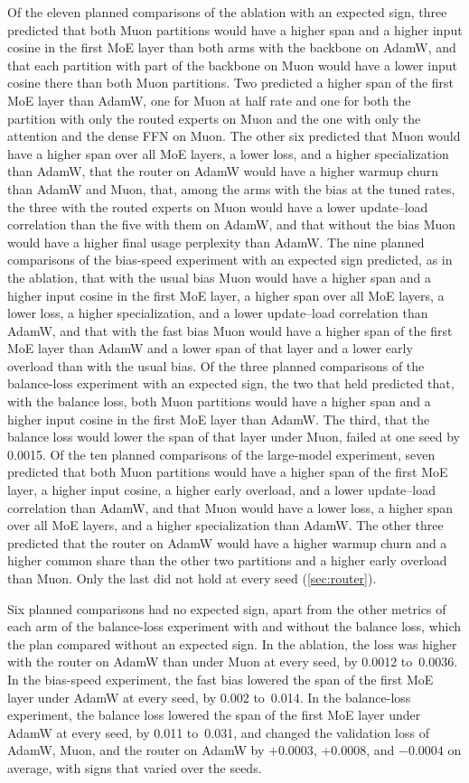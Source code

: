 \documentclass[11pt, a4paper]{article}
\begin{document}
Of the eleven planned comparisons of the ablation with an expected sign, three predicted that both Muon partitions would have a higher span and a higher input cosine in the first MoE layer than both arms with the backbone on AdamW, and that each partition with part of the backbone on Muon would have a lower input cosine there than both Muon partitions. Two predicted a higher span of the first MoE layer than AdamW, one for Muon at half rate and one for both the partition with only the routed experts on Muon and the one with only the attention and the dense FFN on Muon. The other six predicted that Muon would have a higher span over all MoE layers, a lower loss, and a higher specialization than AdamW, that the router on AdamW would have a higher warmup churn than AdamW and Muon, that, among the arms with the bias at the tuned rates, the three with the routed experts on Muon would have a lower update--load correlation than the five with them on AdamW, and that without the bias Muon would have a higher final usage perplexity than AdamW\@. The nine planned comparisons of the bias-speed experiment with an expected sign predicted, as in the ablation, that with the usual bias Muon would have a higher span and a higher input cosine in the first MoE layer, a higher span over all MoE layers, a lower loss, a higher specialization, and a lower update--load correlation than AdamW, and that with the fast bias Muon would have a higher span of the first MoE layer than AdamW and a lower span of that layer and a lower early overload than with the usual bias. Of the three planned comparisons of the balance-loss experiment with an expected sign, the two that held predicted that, with the balance loss, both Muon partitions would have a higher span and a higher input cosine in the first MoE layer than AdamW\@. The third, that the balance loss would lower the span of that layer under Muon, failed at one seed by 0.0015. Of the ten planned comparisons of the large-model experiment, seven predicted that both Muon partitions would have a higher span of the first MoE layer, a higher input cosine, a higher early overload, and a lower update--load correlation than AdamW, and that Muon would have a lower loss, a higher span over all MoE layers, and a higher specialization than AdamW\@. The other three predicted that the router on AdamW would have a higher warmup churn and a higher common share than the other two partitions and a higher early overload than Muon. Only the last did not hold at every seed (\cref{sec:router}).

Six planned comparisons had no expected sign, apart from the other metrics of each arm of the balance-loss experiment with and without the balance loss, which the plan compared without an expected sign. In the ablation, the loss was higher with the router on AdamW than under Muon at every seed, by 0.0012 to~0.0036. In the bias-speed experiment, the fast bias lowered the span of the first MoE layer under AdamW at every seed, by 0.002 to~0.014. In the balance-loss experiment, the balance loss lowered the span of the first MoE layer under AdamW at every seed, by 0.011 to~0.031, and changed the validation loss of AdamW, Muon, and the router on AdamW by $+0.0003$, $+0.0008$, and $-0.0004$ on average, with signs that varied over the seeds.
\end{document}
